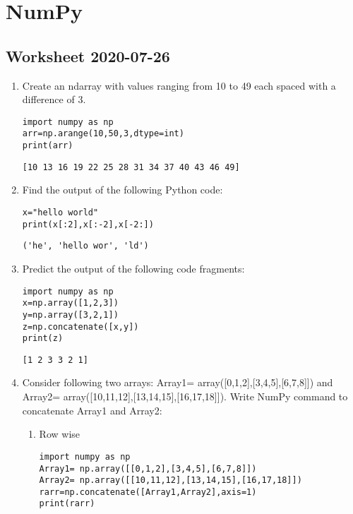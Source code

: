 \documentclass[11pt]{article}
\begin{document}
\section{NumPy}
\label{sec:orgc563831}
\subsection{Worksheet 2020-07-26}
\label{sec:orgae0148f}

\begin{enumerate}
\item Create an ndarray with values ranging from 10 to 49 each spaced with a difference of 3.
\begin{verbatim}
import numpy as np
arr=np.arange(10,50,3,dtype=int)
print(arr)
\end{verbatim}

\begin{verbatim}
[10 13 16 19 22 25 28 31 34 37 40 43 46 49]
\end{verbatim}

\item Find the output of the following Python code:

\begin{verbatim}
x="hello world"
print(x[:2],x[:-2],x[-2:])
\end{verbatim}

\begin{verbatim}
('he', 'hello wor', 'ld')
\end{verbatim}

\item Predict the output of the following code fragments:

\begin{verbatim}
import numpy as np
x=np.array([1,2,3])
y=np.array([3,2,1])
z=np.concatenate([x,y])
print(z)
\end{verbatim}

\begin{verbatim}
[1 2 3 3 2 1]
\end{verbatim}

\item Consider following two arrays: Array1=
array([0,1,2],[3,4,5],[6,7,8]]) and Array2=
array([10,11,12],[13,14,15],[16,17,18]]). Write NumPy command to concatenate Array1 and Array2:

\begin{enumerate}
\item Row wise
\begin{verbatim}
import numpy as np
Array1= np.array([[0,1,2],[3,4,5],[6,7,8]])
Array2= np.array([[10,11,12],[13,14,15],[16,17,18]])
rarr=np.concatenate([Array1,Array2],axis=1)
print(rarr)
\end{verbatim}


\end{enumerate}
\end{enumerate}
\end{document}

